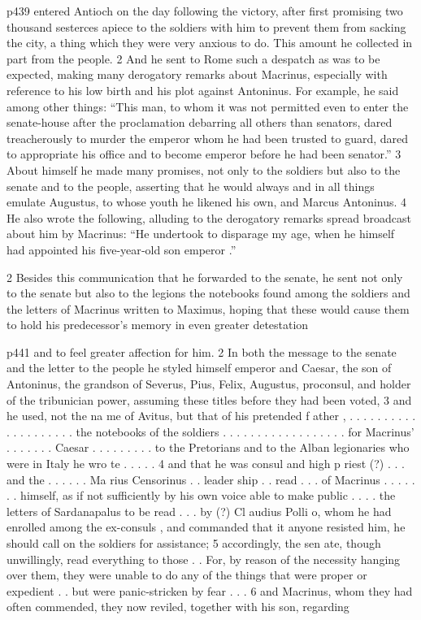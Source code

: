 p439 entered Antioch on the day following the victory, after first promising two thousand sesterces apiece to the soldiers with him to prevent them from sacking the city, a thing which they were very anxious to do. This amount he collected in part from the people. 2 And he sent to Rome such a despatch as was to be expected, making many derogatory remarks about Macrinus, especially with reference to his low birth and his plot against Antoninus. For example, he said among other things: ``This man, to whom it was not permitted even to enter the senate-house after the proclamation debarring all others than senators, dared treacherously to murder the emperor whom he had been trusted to guard, dared to appropriate his office and to become emperor before he had been senator.'' 3 About himself he made many promises, not only to the soldiers but also to the senate and to the people, asserting that he would always and in all things emulate Augustus, to whose youth he likened his own, and Marcus Antoninus. 4 He also wrote the following, alluding to the derogatory remarks spread broadcast about him by Macrinus: ``He undertook to disparage my age, when he himself had appointed his five-year\texthebrew{‑}old son emperor .''

2
Besides this communication that he forwarded to the senate, he sent not only to the senate but also to the legions the notebooks found among the soldiers and the letters of Macrinus written to Maximus, hoping that these would cause them to hold his predecessor's memory in even greater detestation

p441 and to feel greater affection for him. 2 In both the message to the senate and the letter to the people he styled himself emperor and Caesar, the son of Antoninus, the grandson of Severus, Pius, Felix, Augustus, proconsul, and holder of the tribunician power, assuming these titles before they had been voted, 3 and he used, not the na me of Avitus, but that of his pretended f ather , . . . . . . . . . . . . . . . . . . . . the notebooks of the soldiers . . . . . . . . . . . . . . . . . . for Macrinus' . . . . . . . Caesar . . . . . . . . . to the Pretorians and to the Alban legionaries who were in Italy he wro te . . . . . 4 and that he was consul and high p riest (?) . . . and the . . . . . . Ma rius Censorinus . . leader ­ship . . read . . . of Macrinus . . . . . . . himself, as if not sufficiently by his own voice able to make public . . . . the letters of Sardanapalus to be read . . . by (?) Cl audius Polli o, whom he had enrolled among the ex-consuls , and commanded that it anyone resisted him, he should call on the soldiers for assistance; 5 accordingly, the sen ate, though unwillingly, read everything to those . . For, by reason of the necessity hanging over them, they were unable to do any of the things that were proper or expedient . . but were panic-stricken by fear . . . 6 and Macrinus, whom they had often commended, they now reviled, together with his son, regarding

